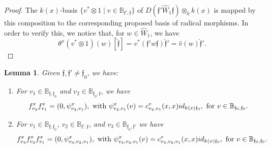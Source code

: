 \documentclass{article}
\newtheorem{lemma}[theorem]{Lemma}
\theoremstyle{definition}
\renewcommand{\frak}{\mathfrak}
\newcommand{\hueca}[1]{\mathbb{#1}}
\begin{document}
\begin{proof}
 The $k(x)$-basis $\{v^*\otimes 1\mid v\in \hueca{B}_{\frak{f}',\frak{f}}\}$ of $D(\frak{f}'\hat{W}_1\frak{f})\otimes_kk(x)$ is mapped by this composition to the corresponding proposed basis of radical morphisms. In order to verify this, we  notice that, for $w\in \hat{W}_1$, we have  
$$\theta^x(v^*\otimes 1)(w)[\hat{\frak{f}}]=v^*(\frak{f}'w\frak{f})\hat{\frak{f}}'=\hat{v}(w)\hat{\frak{f}}'.$$
\end{proof}

 \begin{lemma}\label{L: de las compos de x-basicos}
Given $\frak{f},\frak{f}'\not=\frak{f}_0$,  we have:
\begin{enumerate}
\item For $v_1\in \hueca{B}_{\frak{f},\frak{f}_0}$ and $v_2\in \hueca{B}_{\frak{f}_0,\frak{f}}$, we have 
$$f_{v_2}^x f_{v_1}^x=(0,\psi_{v_2,v_1}^x), \hbox{ with } \psi_{v_2,v_1}^x(v)=c^v_{v_2,v_1}(x,x)id_{k(x)\frak{f}_0}, \hbox{ for } v\in \hueca{B}_{\frak{f}_0,\frak{f}_0}.$$
\item For $v_1\in \hueca{B}_{\frak{f},\frak{f}_0}$, 
 $v_2\in \hueca{B}_{\frak{f}',\frak{f}}$, and $v_3\in \hueca{B}_{\frak{f}_0,\frak{f}'}$ we have 
$$f^x_{v_3} f^x_{v_2} f_{v_1}^x=(0,\psi_{v_3,v_2,v_1}^x), \hbox{ with } \psi_{v_3,v_2,v_1}^x(v)=c^v_{v_3,v_2,v_1}(x,x)id_{k(x)\frak{f}_0}, \hbox{ for } v\in \hueca{B}_{\frak{f}_0,\frak{f}_0}.$$
\end{enumerate}
\end{lemma}
\end{document}
